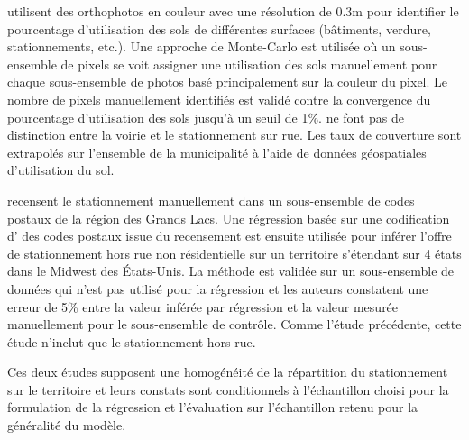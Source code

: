         \textcite{akbari_analyzing_2003} utilisent des orthophotos en couleur avec une résolution de 0.3m pour identifier le pourcentage d'utilisation des sols de différentes surfaces (bâtiments, verdure, stationnements, etc.). Une approche de Monte-Carlo est utilisée où un sous-ensemble de pixels se voit assigner une utilisation des sols manuellement pour chaque sous-ensemble de photos basé principalement sur la couleur du pixel. Le nombre de pixels manuellement identifiés est validé contre la convergence du pourcentage d'utilisation des sols jusqu'à un seuil de 1\%. \citeauthor{akbari_analyzing_2003} ne font pas de distinction entre la voirie et le stationnement sur rue. Les taux de couverture sont extrapolés sur l'ensemble de la municipalité à l'aide de données géospatiales d'utilisation du sol.\par
        \textcite{davis_estimating_2010} recensent le stationnement manuellement dans un sous-ensemble de codes postaux de la région des Grands Lacs. Une régression basée sur une codification d' \fg{} des codes postaux issue du recensement est ensuite utilisée pour inférer l'offre de stationnement hors rue non résidentielle sur un territoire s'étendant sur 4 états dans le Midwest des États-Unis. La méthode est validée sur un sous-ensemble de données qui n'est pas utilisé pour la régression et les auteurs constatent une erreur de 5\% entre la valeur inférée par régression et la valeur mesurée manuellement pour le sous-ensemble de contrôle. Comme l'étude précédente, cette étude n'inclut que le stationnement hors rue. \par
        Ces deux études supposent une homogénéité de la répartition du stationnement sur le territoire et leurs constats sont conditionnels à l'échantillon choisi pour la formulation de la régression et l'évaluation sur l'échantillon retenu pour la généralité du modèle.
    
    
